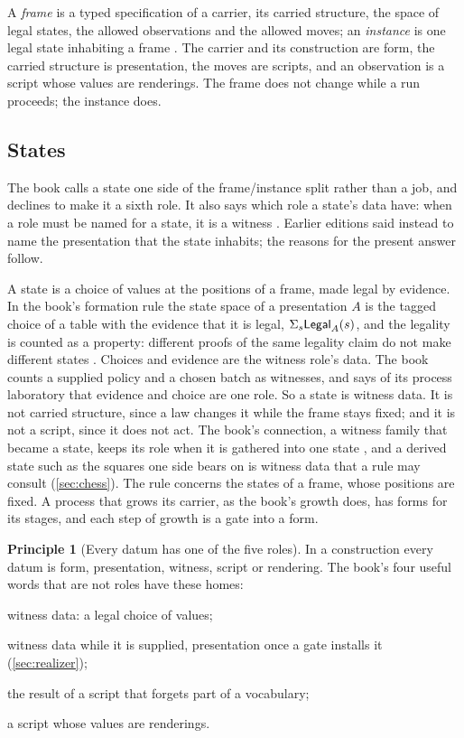 \documentclass[11pt]{article}
\numberwithin{equation}{section}
\theoremstyle{definition}
\newtheorem{principle}[definition]{Principle}
\theoremstyle{plain}
\theoremstyle{remark}
\begin{document}
A \emph{frame} is a typed specification of a carrier, its carried structure,
the space of legal states, the allowed observations and the allowed moves; an
\emph{instance} is one legal state inhabiting a frame \cite[Def.~1.13]{Book}.
The carrier and its construction are form, the carried structure is
presentation, the moves are scripts, and an observation is a script whose
values are renderings.  The frame does not change while a run proceeds; the
instance does.

\subsection{States}\label{sec:states}

The book calls a state one side of the frame/instance split rather than a
job, and declines to make it a sixth role.  It also says which role a state's
data have: when a role must be named for a state, it is a witness
\cite[\S1.9]{Book}.  Earlier editions said instead to name the presentation
that the state inhabits; the reasons for the present answer follow.

A state is a choice of values at the positions of a frame, made legal by
evidence.  In the book's formation rule the state space of a presentation
\(A\) is the tagged choice of a table with the evidence that it is legal,
\(\Sigma_{s}\mathsf{Legal}_A(s)\), and the legality is counted as a
property: different proofs of the same legality claim do not make different
states \cite[\S1.9]{Book}.  Choices and evidence are the witness role's data.
The book counts a supplied policy and a chosen batch as witnesses, and says
of its process laboratory that evidence and choice are one role.  So a state
is witness data.  It is not carried structure, since a law changes it while
the frame stays fixed; and it is not a script, since it does not act.  The
book's connection, a witness family that became a state, keeps its role when
it is gathered into one state \cite[\S5.9]{Book}, and a derived state such as
the squares one side bears on is witness data that a rule may consult
(\cref{sec:chess}).  The rule concerns the states of a frame, whose positions
are fixed.  A process that grows its carrier, as the book's growth does,
has forms for its stages, and each step of growth is a gate into a form.

\begin{principle}[Every datum has one of the five roles]\label{pr:closed}
In a construction every datum is form, presentation, witness, script or
rendering.  The book's four useful words that are not roles have these
homes:
\begin{description}[leftmargin=2.2cm,style=sameline]
\item[state] witness data: a legal choice of values;
\item[policy] witness data while it is supplied, presentation once a gate
installs it (\cref{sec:realizer});
\item[reduct] the result of a script that forgets part of a vocabulary;
\item[observable] a script whose values are renderings.
\end{description}
\end{principle}
\end{document}
